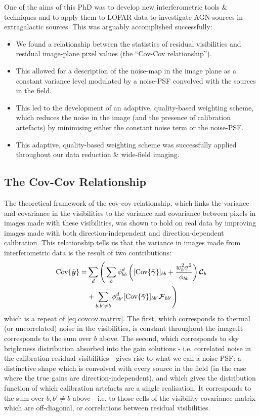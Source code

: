 \pg
One of the aims of this PhD was to develop new interferometric tools \& techniques and to apply them to LOFAR data to investigate AGN sources in extragalactic sources. This was arguably accomplished successfully:
\begin{itemize}
\item We found a relationship between the statistics of residual visibilities and residual image-plane pixel values (the ``Cov-Cov relationship'').
\item This allowed for a description of the noise-map in the image plane as a constant variance level modulated by a noise-PSF convolved with the sources in the field.
\item This led to the development of an adaptive, quality-based weighting scheme, which reduces the noise in the image (and the presence of calibration artefacts) by minimising either the constant noise term or the noise-PSF.
\item This adaptive, quality-based weighting scheme was successfully applied throughout our data reduction \& wide-field imaging.
\end{itemize}

\subsection{The Cov-Cov Relationship}

\pg
The theoretical framework of the cov-cov relationship, which links the variance and covariance in the visibilities to the variance and covariance between pixels in images made with these visibilities, was shown to hold on real data by improving images made with both direction-independent and direction-dependent calibration. This relationship tells us that the variance in images made from interferometric data is the result of two contributions:
\begin{align}
\textrm{Cov}\{\tilde{\bm{{{y}}}}\} =& \sum_d \Bigg(\sum_b \phi_{bb}^d \left( [\textrm{Cov}\{\bm{\tilde{\gamma}}\}]_{bb} + \frac{w_b^2 \sigma^2}{\phi_{bb}} \right) \bm{\mathcal{C}}_b\nonumber\\
              &+ \sum_{b,b'\ne b}  \phi_{bb'}^d [\textrm{Cov}\{\bm{\tilde{\gamma}}\}]_{bb'} \bm{\mathcal{F}}_{bb'} \Bigg)
\end{align}
which is a repeat of \cref{eq.covcov.matrix}. The first, which corresponds to thermal (or uncorrelated) noise in the visibilities, is constant throughout the image.It corresponds to the sum over $b$ above. The second, which corresponds to sky brightness distribution absorbed into the gain solutions - i.e. correlated noise in the calibration residual visibilities - gives rise to what we call a noise-PSF: a distinctive shape which is convolved with every source in the field (in the case where the true gains are direction-independent), and which gives the distribution function of which calibration artefacts are a single realisation. It corresponds to the sum over $b,b'\ne b$ above - i.e. to those cells of the visibility covariance matrix which are off-diagonal, or correlations between residual visibilities.

